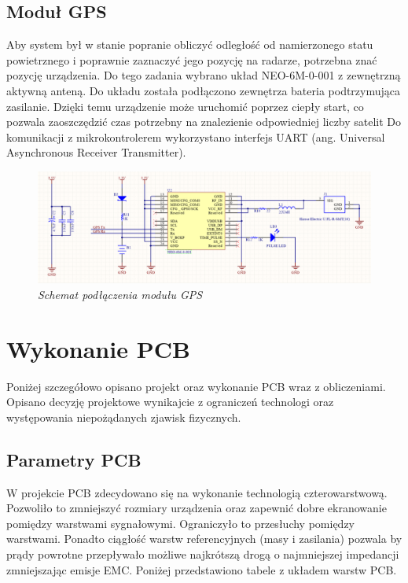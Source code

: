 \documentclass[eng,printmode]{mgr}
\begin{document}
\subsection*{Moduł GPS}
Aby system był w stanie popranie obliczyć odległość od namierzonego statu powietrznego i poprawnie zaznaczyć jego pozycję na radarze, potrzebna znać pozycję urządzenia. Do tego zadania wybrano układ NEO-6M-0-001 z zewnętrzną aktywną anteną. Do układu została podłączono zewnętrza bateria podtrzymująca zasilanie. Dzięki temu urządzenie może uruchomić poprzez ciepły start, co pozwala zaoszczędzić czas potrzebny na znalezienie odpowiedniej liczby satelit Do komunikacji z mikrokontrolerem wykorzystano interfejs UART (ang. Universal Asynchronous Receiver Transmitter).
\begin{figure}[!h]
    \centering
    \includegraphics[width=\textwidth]{schematics/gps.png}
    \caption{\textit{ Schemat podłączenia modułu GPS}}
\end{figure}
\newpage

\section{ Wykonanie PCB }
Poniżej szczegółowo opisano projekt oraz wykonanie PCB wraz z obliczeniami. Opisano decyzję projektowe wynikajcie z ograniczeń technologi oraz występowania niepożądanych zjawisk fizycznych.

\subsection*{Parametry PCB} \label{pcbSection}
W projekcie PCB zdecydowano się na wykonanie technologią czterowarstwową. Pozwoliło to zmniejszyć rozmiary urządzenia oraz zapewnić dobre ekranowanie pomiędzy warstwami sygnałowymi. Ograniczyło to przesłuchy pomiędzy warstwami. Ponadto ciągłość warstw referencyjnych (masy i zasilania) pozwala by prądy powrotne przepływało możliwe najkrótszą drogą o najmniejszej impedancji zmniejszając emisje EMC. Poniżej przedstawiono tabele z układem warstw PCB.
\end{document}
